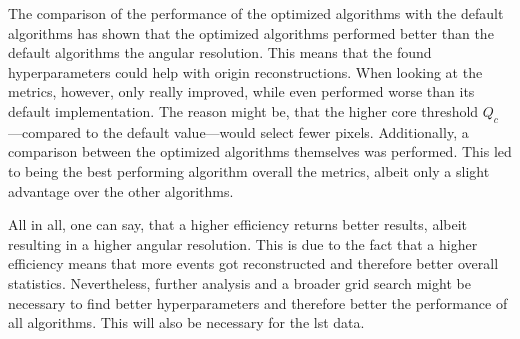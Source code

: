 The comparison of the performance of the optimized algorithms with the default algorithms has shown that
the optimized algorithms performed better than the default algorithms \wrt the angular resolution. This
means that the found hyperparameters could help with origin reconstructions. When looking at the metrics,
however, only \tcc{} really improved, while \fact{} even performed worse than its default implementation.
The reason might be, that the higher core threshold \(Q_c\)---compared to the default value---would
select fewer pixels. Additionally, a comparison between the optimized algorithms themselves was performed. This led to \fact{}
being the best performing algorithm overall \wrt the metrics, albeit only a slight advantage over the
other algorithms.

All in all, one can say, that a higher efficiency returns better results, albeit resulting in a higher angular resolution.
This is due to the fact that a higher efficiency means that more events got reconstructed and therefore
better overall statistics. Nevertheless, further analysis and a broader grid search might be necessary to find better hyperparameters
and therefore better the performance of all algorithms. This will also be necessary for the \gls{lst} data.

